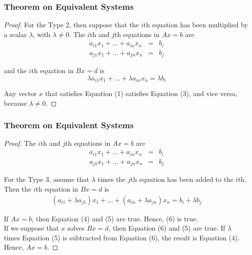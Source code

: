 \documentclass[notheorems,mathserif,table,compress]{beamer}  %
\begin{document}
\begin{frame}
\frametitle{Theorem on Equivalent Systems}
\begin{proof}
For the Type 2, then suppose that the $i$th equation has been multiplied by a scalar $\lambda$, with $\lambda \neq 0$. The $i$th and $j$th equations in $Ax=b$ are
\begin{eqnarray}
a_{i1}x_1+\ldots+a_{in}x_n&=&b_i\\
a_{j1}x_1+\ldots+a_{jn}x_n&=&b_j
\end{eqnarray}

and the $i$th equation in $Bx=d$ is
\begin{equation}
\lambda a_{i1}x_1+\ldots+\lambda a_{in}x_n=\lambda b_i
\end{equation}

Any vector $x$ that satisfies Equation (1) satisfies Equation (3), and vice versa, because $\lambda \neq 0$. 
\end{proof}
\end{frame}

\begin{frame}
\frametitle{Theorem on Equivalent Systems}
\begin{proof}
The $i$th and $j$th equations in $Ax=b$ are
\begin{eqnarray}
a_{i1}x_1+\ldots+a_{in}x_n&=&b_i\\
a_{j1}x_1+\ldots+a_{jn}x_n&=&b_j
\end{eqnarray}

For the Type 3, assume that $\lambda$ times the $j$th equation has been added to the $i$th. Then the $i$th equation in $Bx=d$ is
\begin{eqnarray}
(a_{i1}+\lambda a_{j1})x_1+\ldots+(a_{in}+\lambda a_{jn})x_n=b_i+\lambda b_j
\end{eqnarray}

If $Ax=b$, then Equation (4) and (5) are true. Hence, (6) is true.\\
If we suppose that $x$ solves $Bx=d$, then Equation (6) and (5) are true. If $\lambda$ times Equation (5) is subtracted from Equation (6), the result is Equation (4). Hence, $Ax=b$.
\end{proof}
\end{frame}
\end{document}
